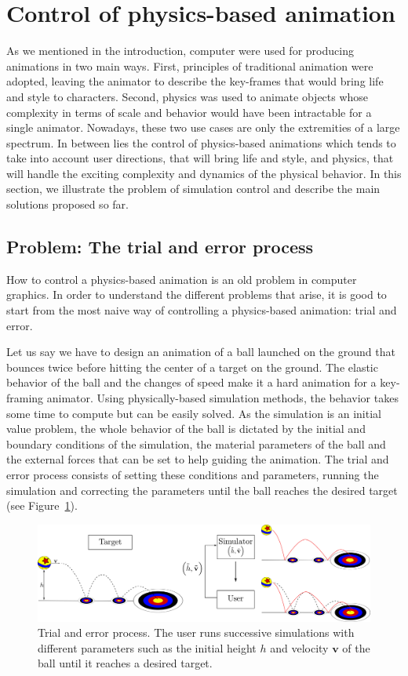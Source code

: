 \section{Control of physics-based animation}
\label{sec:starSimulationControl}

As we mentioned in the introduction, computer were used for producing animations in two main ways. 
First, principles of traditional animation were adopted, leaving the animator to describe the key-frames that would bring life and style to characters. 
Second, physics was used to animate objects whose complexity in terms of scale and behavior would have been intractable for a single animator. 
Nowadays, these two use cases are only the extremities of a large spectrum. 
In between lies the control of physics-based animations which tends to take into account user directions, that will bring life and style, and physics, that will handle the exciting complexity and dynamics of the physical behavior.
In this section, we illustrate the problem of simulation control and describe the main solutions proposed so far.
\subsection{Problem: The trial and error process}
How to control a physics-based animation is an old problem in computer graphics. In order to understand the different problems that arise, it is good to start from the most naive way of controlling a physics-based animation: trial and error.

Let us say we have to design an animation of a ball launched on the ground that bounces twice before hitting the center of a target on the ground. 
The elastic behavior of the ball and the changes of speed make it a hard animation for a key-framing animator. 
Using physically-based simulation methods, the behavior takes some time to compute but can be easily solved.
As the simulation is an initial value problem, the whole behavior of the ball is dictated by the initial and boundary conditions of the simulation, the material parameters of the ball and the external forces that can be set to help guiding the animation. 
The trial and error process consists of setting these conditions and parameters, running the simulation and correcting the parameters until the ball reaches the desired target (see Figure~\ref{fig:trialErrorProcess}). 
\begin{figure}[!h]
	\centering
	\includegraphics[width=\linewidth]{./images/simulationControl/trialError.png}
	\caption[STAR control: Trial and error process]{\label{fig:trialErrorProcess}Trial and error process. 
	The user runs successive simulations with different parameters such as the initial height $h$ and velocity $\mathbf{v}$ of the ball until it reaches a desired target.}
\end{figure}

